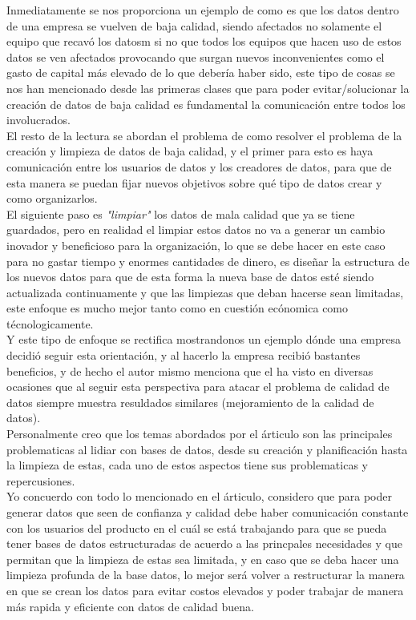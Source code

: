 \documentclass{article}
\begin{document}
Inmediatamente se nos proporciona un ejemplo de como es que los datos dentro de una empresa se vuelven de baja calidad, siendo afectados no solamente el equipo que recavó los datosm si no que todos los equipos que hacen uso de estos datos se ven afectados provocando que surgan nuevos inconvenientes como el gasto de capital más elevado de lo que debería haber sido, este tipo de cosas se nos han mencionado desde las primeras clases que para poder evitar/solucionar la creación de datos de baja calidad es fundamental la comunicación entre todos los involucrados.
\\

El resto de la lectura se abordan el problema de como resolver el problema de la creación y limpieza de datos de baja calidad, y el primer para esto es haya comunicación entre los usuarios de datos y los creadores de datos, para que de esta manera se puedan fijar nuevos objetivos sobre qué tipo de datos crear y como organizarlos.\\

El siguiente paso es \textit{"limpiar" } los datos de mala calidad que ya se tiene guardados, pero en realidad el limpiar estos datos no va a generar un cambio inovador y beneficioso para la organización, lo que se debe hacer en este caso para no gastar tiempo y enormes cantidades de dinero, es diseñar la estructura de los nuevos datos para que de esta forma la nueva base de datos esté siendo actualizada continuamente y que las limpiezas que deban hacerse sean limitadas, este enfoque es mucho mejor tanto como en cuestión ecónomica como técnologicamente.
\\

Y este tipo de enfoque se rectifica mostrandonos un ejemplo dónde una empresa decidió seguir esta orientación, y al hacerlo la empresa recibió bastantes beneficios, y de hecho el autor mismo menciona que el ha visto en diversas ocasiones que al seguir esta perspectiva para atacar el problema de calidad de datos siempre muestra resuldados similares (mejoramiento de la calidad de datos).
\\

Personalmente creo que los temas abordados por el árticulo son las principales problematicas al lidiar con bases de datos, desde su creación y planificación hasta la limpieza de estas, cada uno de estos aspectos tiene sus problematicas y repercusiones.\\

Yo concuerdo con todo lo mencionado en el árticulo, considero que para poder generar datos que seen de confianza y calidad debe haber comunicación constante con los usuarios del producto en el cuál se está trabajando para que se pueda tener bases de datos estructuradas de acuerdo a las princpales necesidades y que permitan que la limpieza de estas sea limitada, y en caso que se deba hacer una limpieza profunda de la base datos, lo mejor será volver a restructurar la manera en que se crean los datos para evitar costos elevados y poder trabajar de manera más rapida y eficiente con datos de calidad buena.
\end{document}
